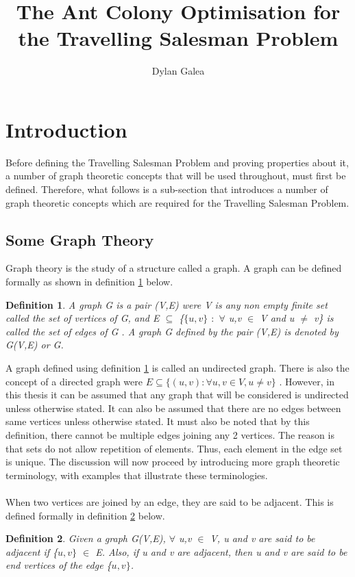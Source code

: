 \documentclass{article}
\title{The Ant Colony Optimisation for the Travelling Salesman Problem}
\author{Dylan Galea}
\newtheorem{definition}{Definition}[subsection]
\begin{document}
\maketitle
\newpage
\tableofcontents
\newpage
\section{Introduction}
Before defining the Travelling Salesman Problem and proving properties about it, a number of graph theoretic concepts that will be used throughout, must first be defined. Therefore, what follows is a sub-section that introduces a number of graph theoretic concepts which are required for the Travelling Salesman Problem.
\subsection{Some Graph Theory}
Graph theory is the study of a structure called a graph. A graph can be defined formally as shown in definition \ref{Graph} below.
\begin{definition}
\label{Graph}
A graph G is a pair (V,E) were V is any non empty finite set called the set of vertices of G, and E $\subseteq$ \{$\{u,v\}$ $:$ $\forall$ u,v $\in$ V and u $\neq$ v\} is called the set of edges of G {}. A graph G defined by the pair (V,E) is denoted by G(V,E) or G.
\end{definition}
A graph defined using definition \ref{Graph} is called an undirected graph. There is also the concept of a directed graph were $\mathit{E \subseteq \{(u,v) : \forall u,v \in V, u \neq v\}}$ \cite{black_tanenbaum_2017}. However, in this thesis it can be assumed that any graph that will be considered is undirected unless otherwise stated. It can also be assumed that there are no edges between same vertices unless otherwise stated. It must also be noted that by this definition, there cannot be multiple edges joining any 2 vertices. The reason is that sets do not allow repetition of elements. Thus, each element in the edge set is unique. The discussion will now proceed by introducing more graph theoretic terminology, with examples that illustrate these terminologies.\\
\\When two vertices are joined by an edge, they are said to be adjacent. This is defined formally in definition \ref{adjacent} below.
\begin{definition}
\label{adjacent}
Given a graph G(V,E), $\forall$ u,v $\in$ V, u and v are said to be adjacent if \{$u,v\}$ $\in$ E. Also, if u and v are adjacent, then u and v are said to be end vertices of the edge \{$u,v\}$. 
\end{definition}
\end{document}
